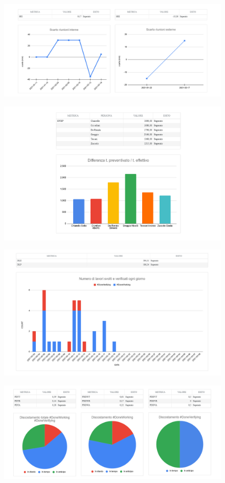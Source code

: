 \begin{figure}[H]
	\includegraphics[scale=0.5]{res/images/cruscotto/pa_4.png}
\end{figure}
\begin{figure}[H]
	\includegraphics[scale=0.5]{res/images/cruscotto/pa_5.png}
\end{figure}
\begin{figure}[H]
	\includegraphics[scale=0.5]{res/images/cruscotto/pa_6.png}
\end{figure}
\begin{figure}[H]
	\includegraphics[scale=0.5]{res/images/cruscotto/pa_7.png}
\end{figure}
\pagebreak
